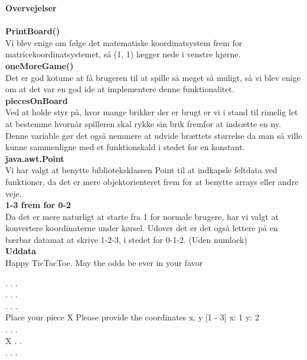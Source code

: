 \documentclass[]{article}
\begin{document}
{\setlength{\parindent}{0 cm}

\textbf{{\huge Overvejelser}}\\\\
\textbf{\large PrintBoard()}\\

Vi blev enige om følge det matematiske koordinatsystem frem for matricekoordinatsystemet, så (1, 1) lægger nede i venstre hjørne. \\

\textbf{\large oneMoreGame()}\\

Det er god kotume at få brugeren til at spille så meget så muligt, så vi blev enige om at det var en god ide at implementere denne funktionalitet.\\

\textbf{\large piecesOnBoard}\\

Ved at holde styr på, hvor mange brikker der er brugt er vi i stand til rimelig let at bestemme hvornår spilleren skal rykke sin brik fremfor at indsætte en ny. Denne variable gør det også nemmere at udvide brættets størrelse da man så ville kunne sammenligne med et funktionskald i stedet for en konstant.\\


\textbf{\large java.awt.Point}\\

Vi har valgt at benytte biblioteksklassen Point til at indkapsle feltdata ved funktioner, da det er mere objektorienteret frem for at benytte arrays eller andre veje.\\

\textbf{\large 1-3 frem for 0-2}\\

Da det er mere naturligt at starte fra 1 for normale brugere, har vi valgt at konvertere koordinaterne under kørsel. Udover det er det også lettere på en bærbar datamat at skrive 1-2-3, i stedet for 0-1-2. (Uden numlock)\\

\textbf{\large Uddata}\\

Happy TicTacToe. May the odds be ever in your favor

. . . \\
. . . \\
. . . \\

Place your piece X
Please provide the coordinates x, y [1 - 3]
x: 1
y: 2\\
. . . \\
X . . \\
. . . \\


}
\end{document}
